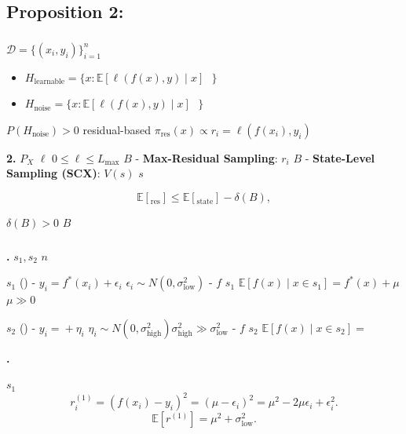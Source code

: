 \documentclass[
  12pt,
]{article}
\providecommand{\tightlist}{%
  \setlength{\itemsep}{0pt}\setlength{\parskip}{0pt}}
\begin{document}
\subsection{Proposition 2:
}\label{proposition-2-ux9ad8ux8befux5deeux91c7ux6837ux5728ux566aux58f0ux4e0bux975eux6700ux4f18}

\subsubsection{}\label{ux6570ux5b66ux9648ux8ff0-1}

 \(\mathcal{D} = \{(x_i, y_i)\}_{i=1}^n\) 

\begin{itemize}
\tightlist
\item
  \textbf{}
  \(H_{\text{learnable}} = \{x: \mathbb{E}[\ell(f(x), y) \mid x] \text{ }\}\)
\item
  \textbf{}
  \(H_{\text{noise}} = \{x: \mathbb{E}[\ell(f(x), y) \mid x] \text{ }\}\)
\end{itemize}

 \(P(H_{\text{noise}}) > 0\) residual-based 
\(\pi_{\text{res}}(x) \propto r_i = \ell(f(x_i), y_i)\)


\textbf{ 2.}  \(P_X\) \(\ell\) 
\(0 \leq \ell \leq L_{\max}\) \(B\) -
\textbf{Max-Residual Sampling}:  \(r_i\)  \(B\)  -
\textbf{State-Level Sampling (SCX)}:  \(V(s)\)  \(s\)




\[\mathbb{E}[\text{}_{\text{res}}] \leq \mathbb{E}[\text{}_{\text{state}}] - \delta(B),\]

 \(\delta(B) > 0\)  \(B\) 

\subsubsection{}\label{ux8bc1ux660e-1}

\textbf{.}  \(s_1, s_2\) \(n\) 

 \(s_1\) () - \(y_i = f^*(x_i) + \epsilon_i\)
\(\epsilon_i \sim N(0, \sigma^2_{\text{low}})\) -  \(f\) 
\(s_1\)
\(\mathbb{E}[f(x) \mid x \in s_1] = f^*(x) + \mu\)
\(\mu \gg 0\)

 \(s_2\) () - \(y_i = \text{} + \eta_i\)
\(\eta_i \sim N(0, \sigma^2_{\text{high}})\)\(\sigma^2_{\text{high}} \gg \sigma^2_{\text{low}}\)
-  \(f\)  \(s_2\)
\(\mathbb{E}[f(x) \mid x \in s_2] = \text{}\)



\textbf{.}

 \(s_1\) 
\[r_i^{(1)} = (f(x_i) - y_i)^2 = (\mu - \epsilon_i)^2 = \mu^2 - 2\mu\epsilon_i + \epsilon_i^2.\]
\[\mathbb{E}[r^{(1)}] = \mu^2 + \sigma^2_{\text{low}}.\]
\end{document}
